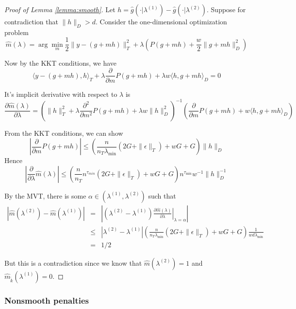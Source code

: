 \documentclass[12pt]{article}
\begin{document}
\begin{proof}[Proof of Lemma \ref{lemma:smooth}]

Let $h=\hat{g}(\cdot|\lambda^{(1)})-\hat{g}(\cdot|\lambda^{(2)})$. Suppose for contradiction that $\|h\|_{D} > d$. 
Consider the one-dimensional optimization problem
\[
\hat{m}(\lambda) = \arg\min_{m}\frac{1}{2}\|y- \left(g +mh\right)\|_{T}^{2}+\lambda\left(P(g+mh)+\frac{w}{2}\|g+mh\|_{D}^{2}\right)
\]

Now by the KKT conditions, we have
\[
\langle y-\left(g+mh\right),h\rangle_{T}+\lambda\frac{\partial}{\partial m}P(g+mh)+\lambda w \langle h,g+mh\rangle_{D}=0
\]


It's implicit derivative with respect to $\lambda$ is
\begin{equation}
 \frac{\partial\hat{m}(\lambda)}{\partial\lambda}  = 
\left ( \| h\|_{T}^2 +\lambda\frac{\partial^{2}}{\partial m^{2}}P(g+mh) +\lambda w\|h\|_{D}^{2} \right )^{-1}
\left ( \frac{\partial}{\partial m}P(g+mh)+w\langle h,g+mh\rangle_{D} \right )
\end{equation}

From the KKT conditions, we can show
\[ 
\left | \frac{\partial}{\partial m}P(g+mh) \right |  \le 
\left(\frac{n}{n_{T} \lambda_{\min}}\left(2G+\|\epsilon\|_{T}\right)+wG+G\right)  \|h\|_{D}
\]
Hence
\[
\left|\frac{\partial}{\partial\lambda}\hat{m}(\lambda)\right| \le
\left(\frac{n}{n_{T}}n^{\tau_{min}}\left(2G+\|\epsilon\|_{T}\right)+wG+G\right)n^{\tau_{\min}}w^{-1}\|h\|_{D}^{-1}
\]

By the MVT, there is some $\alpha\in (\lambda^{(1)},\lambda^{(2)})$ such that 
\begin{eqnarray*}
\left|\hat{m}(\lambda^{(2)})-\hat{m}(\lambda^{(1)})\right| & = & 
\left|\left ( \lambda^{(2)}-\lambda^{(1)} \right ) 
\left . \frac{\partial \hat{m}(\lambda) }{\partial\lambda}\right |_{\lambda=\alpha} \right|\\
 & \le & |\lambda^{(2)}-\lambda^{(1)}|
\left(\frac{n}{n_{T} \lambda_{\min} }\left(2G+\|\epsilon\|_{T}\right)+wG+G\right)\frac{1}{wd \lambda_{\min} } \\
 & = & 1/2
\end{eqnarray*}


But this is a contradiction since we know that $\hat{m}(\lambda^{(2)})=1$
and $\hat{m}_{\tilde{k}}(\lambda^{(1)})=0$.
\end{proof}

\subsubsection{Nonsmooth penalties}\label{sec:nonsmooth}
\end{document}
